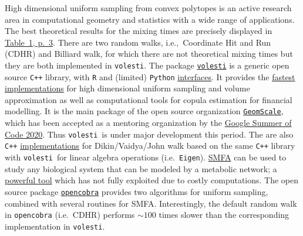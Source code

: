 \documentclass[a4paper, 12pt]{article}
\def\volesti{{\tt volesti}}
\begin{document}
High dimensional uniform sampling from convex polytopes is an active research area in computational geometry and statistics with a wide range of applications.
The best theoretical results for the mixing times are precisely displayed in \textcolor{blue}{\href{https://arxiv.org/abs/1911.05656}{Table~1, p.~3}}. There are two random walks, i.e.,\ Coordinate Hit and Run (CDHR) and Billiard walk, for which there are not theoretical mixing times but they are both implemented in \volesti.
The package \textcolor{blue}{\href{https://github.com/GeomScale/volume_approximation}{\volesti}} is a generic open source {\tt C++} library, with {\tt R} and (limited) {\tt Python} \textcolor{blue}{\href{https://CRAN.R-project.org/package=volesti}{interfaces}}. It provides the \textcolor{blue}{\href{https://github.com/GeomScale/volume_approximation/wiki}{fastest implementations}} for high dimensional uniform sampling and volume approximation as well as computational tools for copula estimation for financial modelling. It is the main package of the open source organization \textcolor{blue}{\href{https://geomscale.github.io/}{{\tt GeomScale}}}, which has been accepted as a mentoring organization by the \textcolor{blue}{\href{https://summerofcode.withgoogle.com/organizations/5673184117915648/}{Google Summer of Code 2020}}. Thus \volesti\ is under major development this period. The are also {\tt C++} \textcolor{blue}{\href{https://github.com/rzrsk/vaidya-walk}{implementations}} for Dikin/Vaidya/John walk based on the same {\tt C++} library with \volesti\ for linear algebra operations (i.e.\ {\tt Eigen}). \textcolor{blue}{\href{https://www.ncbi.nlm.nih.gov/pubmed/12000313}{SMFA}} can be used to study any biological system that can be modeled by a metabolic network; a \textcolor{blue}{\href{https://www.ncbi.nlm.nih.gov/pmc/articles/PMC6718391/}{powerful tool}} which has not fully exploited due to costly computations. The open source package \textcolor{blue}{\href{https://opencobra.github.io/}{{\tt opencobra}}} provides two algorithms for uniform sampling, combined with several routines for SMFA. Interestingly, the default random walk in {\tt opencobra} (i.e.\ CDHR) performs $\sim 100$ times slower than the corresponding implementation in \volesti. 
\end{document}
